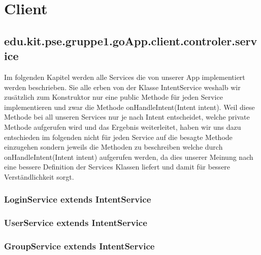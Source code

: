 
\section{Client} 
	\subsection{edu.kit.pse.gruppe1.goApp.client.controler.service}
	Im folgenden Kapitel werden alle Services die von unserer App implementiert werden beschrieben.
	Sie alle erben von der Klasse IntentService weshalb wir zusätzlich zum Konstruktor nur eine public Methode für jeden Service implementieren und zwar die Methode onHandleIntent(Intent intent).
	Weil diese Methode bei all unseren Services nur je nach Intent entscheidet, welche private Methode aufgerufen wird und das Ergebnis weiterleitet, haben wir uns dazu entschieden im folgenden nicht für jeden Service auf die besagte Methode einzugehen sondern jeweils die Methoden zu beschreiben welche durch onHandleIntent(Intent intent) aufgerufen werden, da dies unserer Meinung nach eine bessere Definition der Services Klassen liefert und damit für bessere Verständlichkeit sorgt. 
	
	\subsubsection {LoginService extends IntentService}
	\subsubsection {UserService extends IntentService}
	\subsubsection {GroupService extends IntentService}
